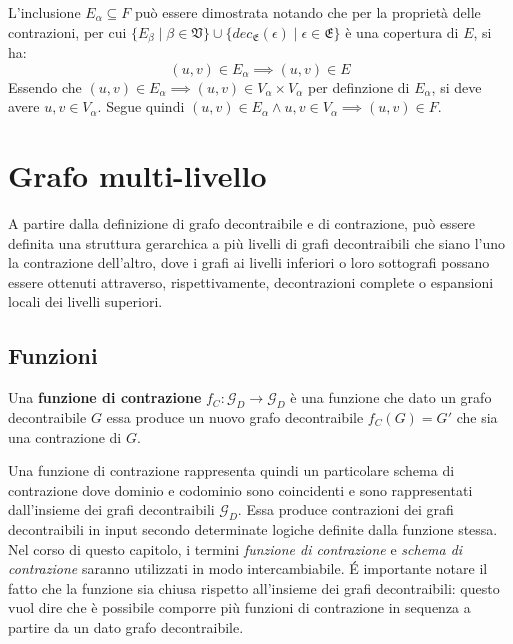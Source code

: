     L'inclusione $E_\alpha \subseteq F$ pu\`o essere dimostrata notando che per la propriet\`a delle contrazioni,
    per cui $\{ E_\beta \mid \beta \in \mathfrak{V}\} \cup
    \{dec_{\mathfrak{E}}(\epsilon) \mid \epsilon \in \mathfrak{E}\} $ \`e una copertura di $E$, si ha:
    \begin{equation*}
        (u, v) \in E_\alpha \implies (u, v) \in E
    \end{equation*}
    Essendo che  $(u, v) \in E_\alpha \implies (u, v) \in V_\alpha \times V_\alpha$ per definzione di $E_\alpha$, si
    deve avere $u, v \in V_\alpha$. Segue quindi $(u, v) \in E_\alpha \land u,v \in V_\alpha \implies (u, v) \in F$.

    \newpage

    \section{Grafo multi-livello}\label{sec:grafo-multi-livello}

    A partire dalla definizione di grafo decontraibile e di contrazione, pu\`o essere definita una struttura gerarchica
    a pi\`u livelli di grafi decontraibili che siano l'uno la contrazione dell'altro, dove i grafi ai livelli inferiori
    o loro sottografi possano essere ottenuti attraverso, rispettivamente, decontrazioni complete o espansioni locali
    dei livelli superiori.

    \subsection{Funzioni}\label{subsec:funzioni}

    \begin{definition}  \newline
    Una \textbf{funzione di contrazione} $f_C : \mathcal{G}_D \rightarrow \mathcal{G}_D$ \`e una funzione che dato un
    grafo decontraibile $G$ essa produce un nuovo grafo decontraibile $f_C(G) = G'$ che sia una contrazione di $G$.
    \end{definition}
    \newline

    Una funzione di contrazione rappresenta quindi un particolare schema di contrazione dove dominio e codominio sono
    coincidenti e sono rappresentati dall'insieme dei grafi decontraibili $\mathcal{G}_D$. Essa produce contrazioni
    dei grafi decontraibili in input secondo determinate logiche definite dalla funzione stessa.
    Nel corso di questo capitolo, i termini \textit{funzione di contrazione} e \textit{schema di contrazione}
    saranno utilizzati in modo intercambiabile. \newline
    \'E importante notare il fatto che la funzione sia chiusa rispetto all'insieme dei grafi decontraibili: questo vuol
    dire che \`e possibile comporre pi\`u funzioni di contrazione in sequenza a partire da un dato grafo decontraibile.
    \newline

